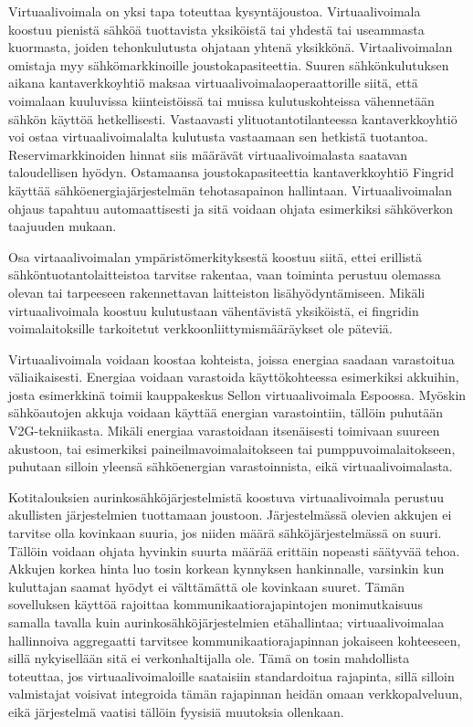   Virtuaalivoimala on yksi tapa toteuttaa kysyntäjoustoa. Virtuaalivoimala koostuu pienistä sähköä tuottavista yksiköistä tai yhdestä tai useammasta kuormasta, joiden tehonkulutusta ohjataan yhtenä yksikkönä. Virtaalivoimalan omistaja myy sähkömarkkinoille joustokapasiteettia. Suuren sähkönkulutuksen aikana kantaverkkoyhtiö maksaa virtuaalivoimalaoperaattorille siitä, että voimalaan kuuluvissa kiinteistöissä tai muissa kulutuskohteissa vähennetään sähkön käyttöä hetkellisesti. Vastaavasti ylituotantotilanteessa kantaverkkoyhtiö voi ostaa virtuaalivoimalalta kulutusta vastaamaan sen hetkistä tuotantoa. Reservimarkkinoiden hinnat siis määrävät virtuaalivoimalasta saatavan taloudellisen hyödyn. Ostamaansa joustokapasiteettia kantaverkkoyhtiö Fingrid käyttää sähköenergiajärjestelmän tehotasapainon hallintaan. Virtuaalivoimalan ohjaus tapahtuu automaattisesti ja sitä voidaan ohjata esimerkiksi sähköverkon taajuuden mukaan.\parencite{fingrid}

  Osa virtaaalivoimalan ympäristömerkityksestä koostuu siitä, ettei erillistä sähköntuotantolaitteistoa tarvitse rakentaa, vaan toiminta perustuu olemassa olevan tai tarpeeseen rakennettavan laitteiston lisähyödyntämiseen. Mikäli virtuaalivoimala koostuu kulutustaan vähentävistä yksiköistä, ei fingridin voimalaitoksille tarkoitetut verkkoonliittymismääräykset ole päteviä\parencite{VJV2018}.

  Virtuaalivoimala voidaan koostaa kohteista, joissa energiaa saadaan varastoitua väliaikaisesti. Energiaa voidaan varastoida käyttökohteessa esimerkiksi akkuihin, josta esimerkkinä toimii kauppakeskus Sellon virtuaalivoimala Espoossa\parencite{sello}. Myöskin sähköautojen akkuja voidaan käyttää energian varastointiin, tällöin puhutään \gls{V2G}-tekniikasta\parencite{dictOfEnergy}. Mikäli energiaa varastoidaan itsenäisesti toimivaan suureen akustoon, tai esimerkiksi paineilmavoimalaitokseen tai pumppuvoimalaitokseen, puhutaan silloin yleensä sähköenergian varastoinnista, eikä virtuaalivoimalasta\parencite{dictOfEnergy}. 

  Kotitalouksien aurinkosähköjärjestelmistä koostuva virtuaalivoimala perustuu akullisten järjestelmien tuottamaan joustoon. Järjestelmässä olevien akkujen ei tarvitse olla kovinkaan suuria, jos niiden määrä sähköjärjestelmässä on suuri. Tällöin voidaan ohjata hyvinkin suurta määrää erittäin nopeasti säätyvää tehoa. Akkujen korkea hinta luo tosin korkean kynnyksen hankinnalle, varsinkin kun kuluttajan saamat hyödyt ei välttämättä ole kovinkaan suuret. Tämän sovelluksen käyttöä rajoittaa kommunikaatiorajapintojen monimutkaisuus samalla tavalla kuin aurinkosähköjärjestelmien etähallintaa; virtuaalivoimalaa hallinnoiva aggregaatti tarvitsee kommunikaatiorajapinnan jokaiseen kohteeseen, sillä nykyisellään sitä ei verkonhaltijalla ole. Tämä on tosin mahdollista toteuttaa, jos virtuaalivoimaloille saataisiin standardoitua rajapinta, sillä silloin valmistajat voisivat integroida tämän rajapinnan heidän omaan verkkopalveluun, eikä järjestelmä vaatisi tällöin fyysisiä muutoksia ollenkaan.

